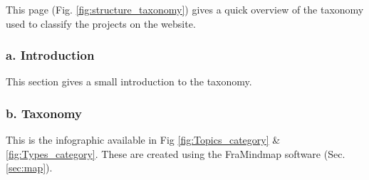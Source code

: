 This page (Fig. \ref{fig:structure_taxonomy}) gives a quick overview of the taxonomy used to classify the projects on the website.

\subsubsection*{a. Introduction}
This section gives a small introduction to the taxonomy.

\subsubsection*{b. Taxonomy}
This is the infographic available in Fig \ref{fig:Topics_category} \& \ref{fig:Types_category}. These are created using the FraMindmap software (Sec. \ref{sec:map}).

\begin{landscape}
    

\end{landscape}
